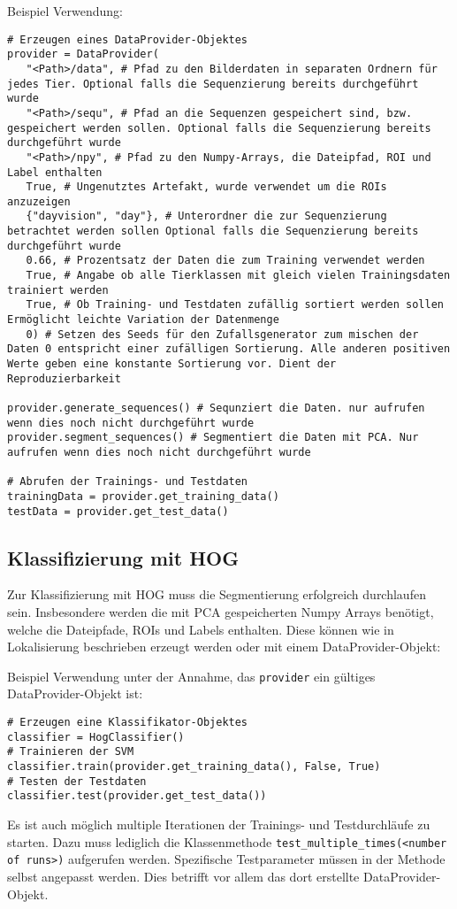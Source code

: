 Beispiel Verwendung:
\begin{verbatim}
# Erzeugen eines DataProvider-Objektes
provider = DataProvider(
   "<Path>/data", # Pfad zu den Bilderdaten in separaten Ordnern für jedes Tier. Optional falls die Sequenzierung bereits durchgeführt wurde
   "<Path>/sequ", # Pfad an die Sequenzen gespeichert sind, bzw. gespeichert werden sollen. Optional falls die Sequenzierung bereits durchgeführt wurde
   "<Path>/npy", # Pfad zu den Numpy-Arrays, die Dateipfad, ROI und Label enthalten
   True, # Ungenutztes Artefakt, wurde verwendet um die ROIs anzuzeigen
   {"dayvision", "day"}, # Unterordner die zur Sequenzierung betrachtet werden sollen Optional falls die Sequenzierung bereits durchgeführt wurde
   0.66, # Prozentsatz der Daten die zum Training verwendet werden
   True, # Angabe ob alle Tierklassen mit gleich vielen Trainingsdaten trainiert werden
   True, # Ob Training- und Testdaten zufällig sortiert werden sollen Ermöglicht leichte Variation der Datenmenge
   0) # Setzen des Seeds für den Zufallsgenerator zum mischen der Daten 0 entspricht einer zufälligen Sortierung. Alle anderen positiven Werte geben eine konstante Sortierung vor. Dient der Reproduzierbarkeit

provider.generate_sequences() # Sequnziert die Daten. nur aufrufen wenn dies noch nicht durchgeführt wurde
provider.segment_sequences() # Segmentiert die Daten mit PCA. Nur aufrufen wenn dies noch nicht durchgeführt wurde

# Abrufen der Trainings- und Testdaten
trainingData = provider.get_training_data()
testData = provider.get_test_data()
\end{verbatim}
 

\subsection*{Klassifizierung mit HOG}
Zur Klassifizierung mit HOG muss die Segmentierung erfolgreich durchlaufen sein. Insbesondere werden die mit PCA gespeicherten Numpy Arrays benötigt, welche die Dateipfade, ROIs und Labels enthalten. Diese können wie in Lokalisierung beschrieben erzeugt werden oder mit einem DataProvider-Objekt:

Beispiel Verwendung unter der Annahme, das \texttt{provider} ein gültiges DataProvider-Objekt ist:

\begin{verbatim}
# Erzeugen eine Klassifikator-Objektes
classifier = HogClassifier()
# Trainieren der SVM
classifier.train(provider.get_training_data(), False, True)
# Testen der Testdaten
classifier.test(provider.get_test_data())
\end{verbatim}
Es ist auch möglich multiple Iterationen der Trainings- und Testdurchläufe zu starten. Dazu muss lediglich die Klassenmethode \texttt{test\_multiple\_times(<number of runs>)} aufgerufen werden. Spezifische Testparameter müssen in der Methode selbst angepasst werden. Dies betrifft vor allem das dort erstellte DataProvider-Objekt.



